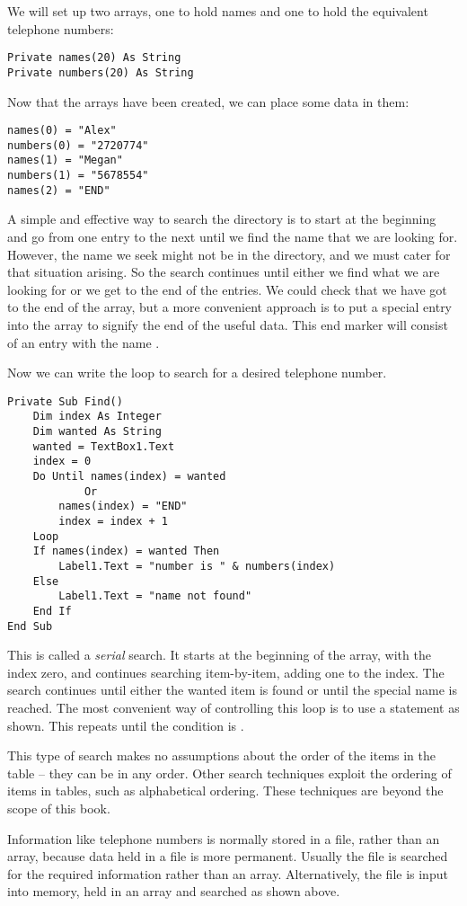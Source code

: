 		We will set up two arrays, one to hold names and one to hold the equivalent telephone numbers:
		\begin{lstlisting}
Private names(20) As String
Private numbers(20) As String
		\end{lstlisting}
		Now that the arrays have been created, we can place some data in them:
		\begin{lstlisting}
names(0) = "Alex"
numbers(0) = "2720774"
names(1) = "Megan"
numbers(1) = "5678554"
names(2) = "END"
		\end{lstlisting}
		A simple and effective way to search the directory is to start at the beginning and go from one entry to the next until we find the name that we are looking for. However, the name we seek might not be in the directory, and we must cater for that situation arising. So the search continues until either we find what we are looking for or we get to the end of the entries. We could check that we have got to the end of the array, but a more convenient approach is to put a special entry into the array to signify the end of the useful data. This end marker will consist of an entry with the name .
		
		Now we can write the loop to search for a desired telephone number.
		\begin{lstlisting}
Private Sub Find()
	Dim index As Integer
	Dim wanted As String
	wanted = TextBox1.Text
	index = 0
	Do Until names(index) = wanted
			Or
		names(index) = "END"
		index = index + 1
	Loop
	If names(index) = wanted Then
		Label1.Text = "number is " & numbers(index)
	Else
		Label1.Text = "name not found"
	End If
End Sub
		\end{lstlisting}
		This is called a \emph{serial} search. It starts at the beginning of the array, with the index zero, and continues searching item-by-item, adding one to the index. The search continues until either the wanted item is found or until the special name  is reached. The most convenient way of controlling this loop is to use a  statement as shown. This repeats until the condition is .
		
		This type of search makes no assumptions about the order of the items in the table – they can be in any order. Other search techniques exploit the ordering of items in tables, such as alphabetical ordering. These techniques are beyond the scope of this book.
		
		Information like telephone numbers is normally stored in a file, rather than an array, because data held in a file is more permanent. Usually the file is searched for the required information rather than an array. Alternatively, the file is input into memory, held in an array and searched as shown above.


